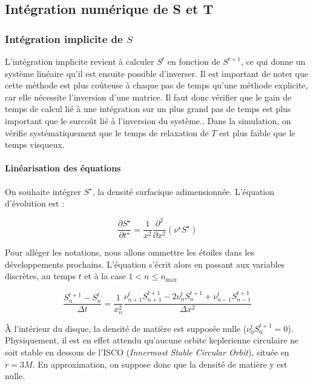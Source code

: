 \subsection{Intégration numérique de S et T}

\subsubsection{Intégration implicite de $S$}

\label{ssec:integration_S_imp}

L'intégration implicite revient à calculer $S^t$ en fonction de $S^{t+1}$, ce
qui donne un système linéaire qu'il est ensuite possible d'inverser. Il est
important de noter que cette méthode est plus coûteuse à chaque pas de temps
qu'une méthode explicite, car elle nécessite l'inversion d'une matrice. Il faut
donc vérifier que le gain de temps de calcul lié à une intégration sur un plus
grand pas de temps est plus important que le surcoût lié à l'inversion du
système.. Dans la simulation, on vérifie systématiquement que
le temps de relaxation de $T$ est plus faible que le temps visqueux.

\paragraph{Linéarisation des équations}

On souhaite intégrer $S^\star$, la densité surfacique adimensionnée. L'équation
d'évolution est :

\begin{equation}
  \frac{\partial S^\star}{\partial t^\star} = \frac{1}{x^2}\frac{\partial^2}{\partial x^2}\left(\nu^\star S^\star\right)
\end{equation}

Pour alléger les notations, nous allons ommettre les étoiles dans les
développements prochains. L'équation s'écrit alors en passant aux variables
discrètes, au temps $t$ et à la case $1<n\leq n_\textrm{max}$

\begin{equation}
  \label{eq:S_discret_n}
  \frac{S^{t+1}_n - S^t_n}{\Delta t} = \frac{1}{x_n^2}\frac{\nu^t_{n+1}S^{t+1}_{n+1} - 2 \nu^t_nS^{t+1}_n + \nu^t_{n-1}S^{t+1}_{n-1}}{\Delta x^2}
\end{equation}

À l'intérieur du disque, la densité de matière est supposée nulle
($\nu^t_{0}S^{t+1}_{0} = 0$). Physiquement, il est en effet attendu qu'aucune
orbite keplerienne circulaire ne soit stable en dessous de l'ISCO
(\emph{\emph{I}nnermost \emph{S}table \emph{C}ircular \emph{O}rbit}), située en
$r = 3M$. En approximation, on suppose donc que la densité de matière y est
nulle.

